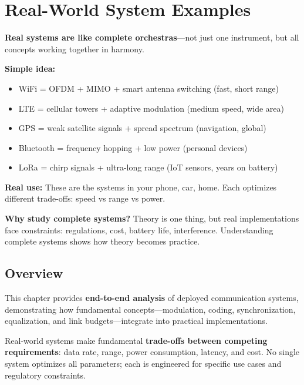\chapter{Real-World System Examples}
\label{ch:real-world-systems}

\begin{nontechnical}
\textbf{Real systems are like complete orchestras}---not just one instrument, but all concepts working together in harmony.

\textbf{Simple idea:}
\begin{itemize}
\item WiFi = OFDM + MIMO + smart antenna switching (fast, short range)
\item LTE = cellular towers + adaptive modulation (medium speed, wide area)
\item GPS = weak satellite signals + spread spectrum (navigation, global)
\item Bluetooth = frequency hopping + low power (personal devices)
\item LoRa = chirp signals + ultra-long range (IoT sensors, years on battery)
\end{itemize}

\textbf{Real use:} These are the systems in your phone, car, home. Each optimizes different trade-offs: speed vs range vs power.

\textbf{Why study complete systems?} Theory is one thing, but real implementations face constraints: regulations, cost, battery life, interference. Understanding complete systems shows how theory becomes practice.
\end{nontechnical}

\section{Overview}

This chapter provides \textbf{end-to-end analysis} of deployed communication systems, demonstrating how fundamental concepts---modulation, coding, synchronization, equalization, and link budgets---integrate into practical implementations.

\begin{keyconcept}
Real-world systems make fundamental \textbf{trade-offs between competing requirements}: data rate, range, power consumption, latency, and cost. No single system optimizes all parameters; each is engineered for specific use cases and regulatory constraints.
\end{keyconcept}

